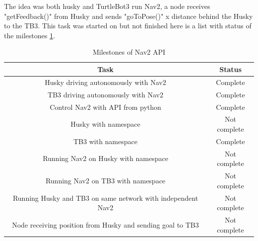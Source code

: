 The idea was both husky and TurtleBot3 run Nav2, a node receives "getFeedback()" from Husky and sends "goToPose()" x distance behind the Husky to the TB3. This task was started on but not finished here is a list with status of the milestones \ref{tab:MilestonesNav2API}.

\begin{table}[H]
    \centering
    \begin{tabular}{c|c}
        Task                                                        & Status   \\ \hline
        Husky driving autonomously with Nav2                        & Complete \\
        TB3 driving autonomously with Nav2                          & Complete \\
        Control Nav2 with API from python                           & Complete \\
        Husky with namespace                                        & Not complete \\
        TB3 with namespace                                          & Complete \\
        Running Nav2 on Husky with namespace                        & Not complete \\
        Running Nav2 on TB3 with namespace                          & Not complete \\
        Running Husky and TB3 on same network with independent Nav2 & Not complete\\
        Node receiving position from Husky and sending goal to TB3  & Not complete \\
    \end{tabular}
    \caption{Milestones of Nav2 API}
    \label{tab:MilestonesNav2API}
\end{table}
   

